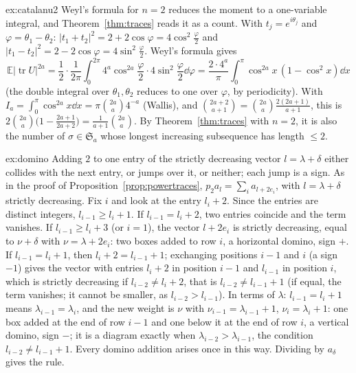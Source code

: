 \begin{solution}{ex:catalanu2}
\idea Weyl's formula for $n=2$ reduces the moment to a one-variable integral, and Theorem~\ref{thm:traces} reads it as a count.
\writeup With $t_j=e^{i\theta_j}$ and $\varphi=\theta_1-\theta_2$: $|t_1+t_2|^2=2+2\cos\varphi=4\cos^2\frac\varphi2$ and $|t_1-t_2|^2=2-2\cos\varphi=4\sin^2\frac\varphi2$. Weyl's formula gives
\[
\mathbb E|\operatorname{tr}U|^{2a}=\frac12\cdot\frac1{2\pi}\int_0^{2\pi}4^a\cos^{2a}\frac\varphi2\cdot4\sin^2\frac\varphi2\dd\varphi=\frac{2\cdot4^a}\pi\int_0^\pi\cos^{2a}x\,(1-\cos^2x)\dd x
\]
(the double integral over $\theta_1,\theta_2$ reduces to one over $\varphi$, by periodicity). With $I_a=\int_0^\pi\cos^{2a}x\dd x=\pi\binom{2a}a4^{-a}$ (Wallis), and $\binom{2a+2}{a+1}=\binom{2a}a\frac{2(2a+1)}{a+1}$, this is
$2\binom{2a}a\bigl(1-\frac{2a+1}{2a+2}\bigr)=\frac1{a+1}\binom{2a}a$. By Theorem~\ref{thm:traces} with $n=2$, it is also the number of $\sigma\in\mathfrak S_a$ whose longest increasing subsequence has length $\le2$.
\end{solution}

\begin{solution}{ex:domino}
\idea Adding $2$ to one entry of the strictly decreasing vector $l=\lambda+\delta$ either collides with the next entry, or jumps over it, or neither; each jump is a sign.
\writeup As in the proof of Proposition~\ref{prop:powertraces}, $p_2a_l=\sum_ia_{l+2e_i}$, with $l=\lambda+\delta$ strictly decreasing. Fix $i$ and look at the entry $l_i+2$. Since the entries are distinct integers, $l_{i-1}\ge l_i+1$. If $l_{i-1}=l_i+2$, two entries coincide and the
term vanishes. If $l_{i-1}\ge l_i+3$ (or $i=1$), the vector $l+2e_i$ is strictly decreasing, equal to $\nu+\delta$ with $\nu=\lambda+2e_i$: two boxes added to row $i$, a horizontal domino, sign $+$. If $l_{i-1}=l_i+1$, then $l_i+2=l_{i-1}+1$; exchanging positions $i-1$ and $i$ (a
sign $-1$) gives the vector with entries $l_i+2$ in position $i-1$ and $l_{i-1}$ in position $i$, which is strictly decreasing if $l_{i-2}\ne l_i+2$, that is $l_{i-2}\ne l_{i-1}+1$ (if equal, the term vanishes; it cannot be smaller, as $l_{i-2}>l_{i-1}$). In terms of $\lambda$: $l_{i-1}=l_i+1$
means $\lambda_{i-1}=\lambda_i$, and the new weight is $\nu$ with $\nu_{i-1}=\lambda_{i-1}+1$, $\nu_i=\lambda_i+1$: one box added at the end of row $i-1$ and one below it at the end of row $i$, a vertical domino, sign $-$; it is a diagram exactly when $\lambda_{i-2}>\lambda_{i-1}$,
the condition $l_{i-2}\ne l_{i-1}+1$. Every domino addition arises once in this way. Dividing by $a_\delta$ gives the rule.
\end{solution}

